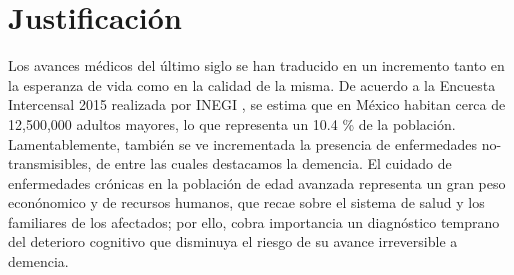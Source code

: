 \documentclass[12pt,a4paper]{mitthesis}
\begin{document}
%
%
%


\section{Justificaci\'on}

Los avances m\'edicos del \'ultimo siglo se han traducido en un incremento tanto en la esperanza de 
vida como en la calidad de la misma. 
De acuerdo a la Encuesta Intercensal 2015 realizada por INEGI \cite{Intercensal15}, se estima que
en M\'exico habitan cerca de 12,500,000 adultos mayores, lo que representa un 10.4 \%  de la 
poblaci\'on.
%
Lamentablemente, tambi\'en se ve incrementada la presencia de enfermedades no-transmisibles, de 
entre las cuales destacamos la demencia.
El cuidado de enfermedades cr\'onicas en la poblaci\'on de edad avanzada representa un gran peso 
econ\'onomico y de recursos humanos, que recae sobre el sistema de salud y los familiares de los 
afectados; por ello, cobra importancia un diagn\'ostico temprano del deterioro cognitivo que 
disminuya el riesgo de su avance irreversible a demencia.
\end{document}
